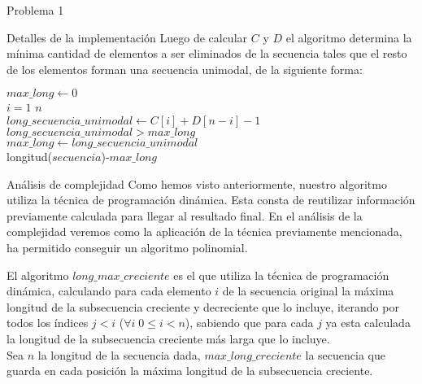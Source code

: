 \begin{section}{Problema 1}
\begin{subsection}{Detalles de la implementación}
		Luego de calcular $C$ y $D$ el algoritmo determina la mínima cantidad de elementos a ser eliminados de
		la secuencia tales que el resto de los elementos forman una secuencia unimodal, de la siguiente forma:
		
		\vspace{0.5cm}
		\begin{pseudo}
			\tab $max\_long \leftarrow 0$ \\
			\tab \FOR $i=1$ \TO $n$ \\
			\tab \tab $long\_secuencia\_unimodal\leftarrow C[i]+D[n-i]-1$ \\
			\tab \tab \IF $ long\_secuencia\_unimodal >  max\_long$ \\
			\tab \tab \tab $max\_long \leftarrow long\_secuencia\_unimodal$ \\
			\tab \RET longitud($secuencia$)-$max\_long$
		\end{pseudo}

	\end{subsection}

	\newpage

	\begin{subsection}{Análisis de complejidad}
		Como hemos visto anteriormente, nuestro algoritmo utiliza la técnica de programación dinámica. Esta consta de 
		reutilizar información previamente calculada para llegar al resultado final. En el análisis de la complejidad veremos como la
		aplicación de la técnica previamente mencionada, ha permitido conseguir un algoritmo polinomial.
	
		El algoritmo $long\_max\_creciente$ es el que utiliza la técnica de programación dinámica, calculando para cada elemento 
		$i$ de la secuencia original la máxima longitud de la subsecuencia creciente y decreciente que lo incluye, iterando 
		por todos los índices $j<i$ ($\forall i\; 0 \leq i < n$), sabiendo que para cada $j$ ya esta calculada la longitud de 
		la subsecuencia creciente más larga que lo incluye.\\

		Sea $n$ la longitud de la secuencia dada, $max\_long\_creciente$ la secuencia que guarda en cada posición la máxima 
		longitud de la subsecuencia creciente.\\


\end{subsection}
\end{section}
